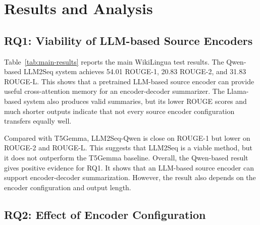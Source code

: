 \documentclass[11pt]{article}
\begin{document}
\section{Results and Analysis}
\label{sec:results}

\subsection{RQ1: Viability of LLM-based Source Encoders}

Table~\ref{tab:main-results} reports the main WikiLingua test results.
The Qwen-based LLM2Seq system achieves 54.01 ROUGE-1, 20.83 ROUGE-2, and 31.83 ROUGE-L.
This shows that a pretrained LLM-based source encoder can provide useful cross-attention memory for an encoder-decoder summarizer.
The Llama-based system also produces valid summaries, but its lower ROUGE scores and much shorter outputs indicate that not every source encoder configuration transfers equally well.

Compared with T5Gemma, LLM2Seq-Qwen is close on ROUGE-1 but lower on ROUGE-2 and ROUGE-L.
This suggests that LLM2Seq is a viable method, but it does not outperform the T5Gemma baseline.
Overall, the Qwen-based result gives positive evidence for RQ1.
It shows that an LLM-based source encoder can support encoder-decoder summarization.
However, the result also depends on the encoder configuration and output length.

\begin{table}[ht]
\centering
\small
{}
\caption{WikiLingua test results. ROUGE values are F1 percentages. \textbf{Avg. Words} is the average number of words in the generated summaries. \textbf{Too Long (\%)} is the percentage of generated summaries that exceed their reference length. For comparison, reference summaries have an average of 51.86 words.}
\label{tab:main-results}
\end{table}

\subsection{RQ2: Effect of Encoder Configuration}
\end{document}
